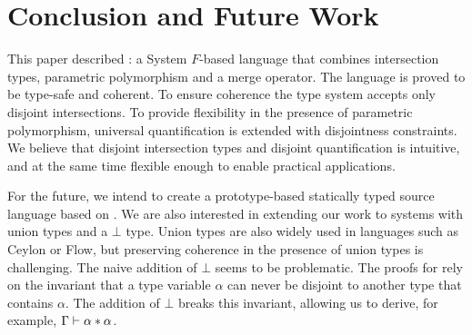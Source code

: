 \section{Conclusion and Future Work}
\label{sec:conclusion}

This paper described \name: a System $F$-based language that combines
intersection types, parametric polymorphism and a merge operator.
The language is proved to be type-safe and coherent.
To ensure coherence the type system accepts only
disjoint intersections. To provide flexibility in the presence of parametric polymorphism,
universal quantification is extended with
disjointness constraints. We believe that disjoint intersection types
and disjoint quantification is intuitive, and at the same time
flexible enough to enable practical applications.


For the future, we intend to create a prototype-based statically typed
source language based on \name.  We are also interested in extending
our work to systems with union types and a $\bot$ type. Union types
are also widely used in languages such as Ceylon or Flow, but
preserving coherence in the presence of union types is
challenging. The naive addition of $\bot$ seems to be problematic. 
The proofs for \name rely on the invariant that a type variable $\alpha$ can never be disjoint 
to another type that contains $\alpha$. The addition of $\bot$ breaks
this invariant, allowing us to derive, for example, $\Gamma \vdash \alpha * \alpha$. 



